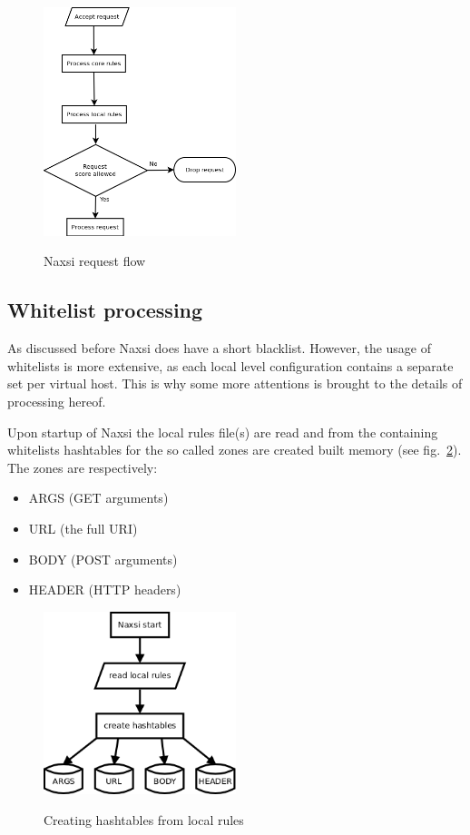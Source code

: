 \documentclass[Naxsi]{subfiles}
\begin{document}
\begin{figure}[h]
\caption{Naxsi request flow}
\centering
\includegraphics[width=0.5\textwidth] {images/naxsi_flow.png}
\label{fig:naxsi_flow}
\end{figure}

\subsection{Whitelist processing}
\label{sec:naxsi_whitelist}
As discussed before Naxsi does have a short blacklist. However, the usage of whitelists is more extensive, as each local level configuration contains a separate set per virtual host. This is why some more attentions is brought to the details of processing hereof.

Upon startup of Naxsi the local rules file(s) are read and from the containing whitelists hashtables for the so called zones are created built memory (see fig.~\ref{fig:hashtables}). The zones are respectively:
\begin{itemize}
	\item ARGS (GET arguments)
	\item URL (the full URI)
	\item BODY (POST arguments)
	\item HEADER (HTTP headers)
\end{itemize}

\begin{figure}[h]
\caption{Creating hashtables from local rules}
\centering
\includegraphics[width=0.5\textwidth] {images/hashtables.png}
\label{fig:hashtables}
\end{figure}
\end{document}
